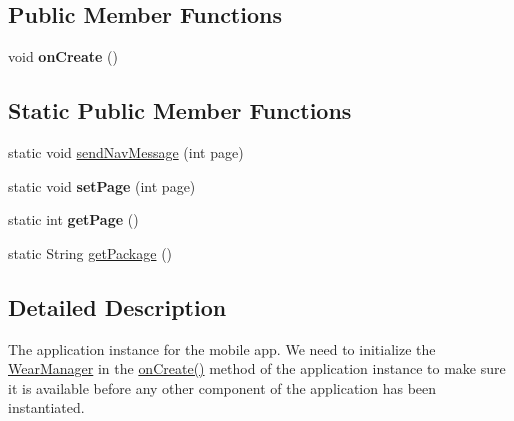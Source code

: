 \subsection*{Public Member Functions}
\begin{DoxyCompactItemize}
\item 
void {\bfseries on\+Create} ()\hypertarget{classcom_1_1example_1_1android_1_1wearable_1_1wcldemo_1_1MobileApplication_a59ee9311e991322436f99010582acb7a}{}\label{classcom_1_1example_1_1android_1_1wearable_1_1wcldemo_1_1MobileApplication_a59ee9311e991322436f99010582acb7a}

\end{DoxyCompactItemize}
\subsection*{Static Public Member Functions}
\begin{DoxyCompactItemize}
\item 
static void \hyperlink{classcom_1_1example_1_1android_1_1wearable_1_1wcldemo_1_1MobileApplication_ad0fb4714bc0e8f5ca80d0c6fc2b4e97d}{send\+Nav\+Message} (int page)
\item 
static void {\bfseries set\+Page} (int page)\hypertarget{classcom_1_1example_1_1android_1_1wearable_1_1wcldemo_1_1MobileApplication_a8e7ef47c1b624670e7dc75fe301128f1}{}\label{classcom_1_1example_1_1android_1_1wearable_1_1wcldemo_1_1MobileApplication_a8e7ef47c1b624670e7dc75fe301128f1}

\item 
static int {\bfseries get\+Page} ()\hypertarget{classcom_1_1example_1_1android_1_1wearable_1_1wcldemo_1_1MobileApplication_a572b69e725dda345c87c376acd876c23}{}\label{classcom_1_1example_1_1android_1_1wearable_1_1wcldemo_1_1MobileApplication_a572b69e725dda345c87c376acd876c23}

\item 
static String \hyperlink{classcom_1_1example_1_1android_1_1wearable_1_1wcldemo_1_1MobileApplication_acb53529e4d30b2b171ae328204f7ff1f}{get\+Package} ()
\end{DoxyCompactItemize}


\subsection{Detailed Description}
The application instance for the mobile app. We need to initialize the \hyperlink{}{Wear\+Manager} in the \hyperlink{}{on\+Create()} method of the application instance to make sure it is available before any other component of the application has been instantiated. 

